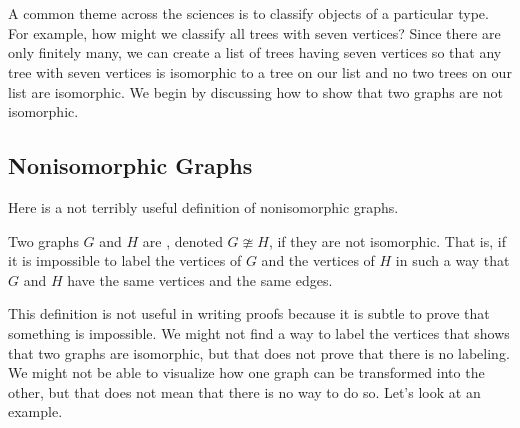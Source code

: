 \section{\secclassifygraphs}
\label{sec_classify_graphs}

A common theme across the sciences is to classify objects of a particular type.  For example, how might we classify all trees with seven vertices?  Since there are only finitely many, we can create a list of trees having seven vertices so that any tree with seven vertices is isomorphic to a tree on our list and no two trees on our list are isomorphic.  
We begin by discussing how to show that two graphs are not isomorphic.


\newcommand{\subnonisograph}{Nonisomorphic Graphs}
\subsection{\subnonisograph}
\label{sub_nonisomorphic_graphs}

Here is a not terribly useful definition of nonisomorphic graphs.

\begin{defn}[Nonisomorphic]
\label{defn_nonism}
    Two graphs $G$ and $H$ are , denoted $G \ncong H$, if they are not isomorphic. That is, if it is impossible to label the vertices of $G$ and the vertices of $H$ in such a way that $G$ and $H$ have the same vertices and the same edges.    
\end{defn}

This definition is not useful in writing proofs because it is subtle to prove that something is impossible.  We might not find a way to label the vertices that shows that two graphs are isomorphic, but that does not prove that there is no labeling.  We might not be able to visualize how one graph can be transformed into the other, but that does not mean that there is no way to do so. Let's look at an example.

